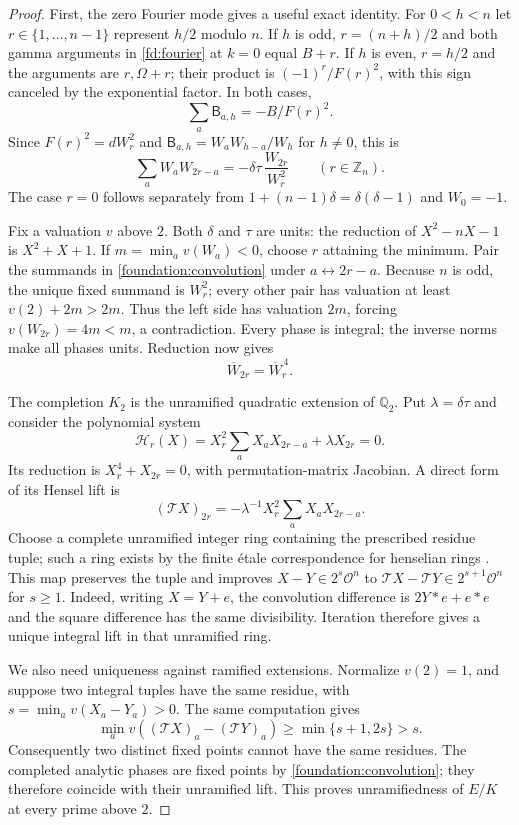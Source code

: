 \documentclass[11pt]{article}
\numberwithin{equation}{section}
\theoremstyle{definition}
\theoremstyle{remark}
\begin{document}
\begin{proof}
First, the zero Fourier mode gives a useful exact identity.
For $0<h<n$ let $r\in\{1,\ldots,n-1\}$ represent $h/2$ modulo $n$.
If $h$ is odd, $r=(n+h)/2$ and both gamma arguments in
\eqref{fd:fourier} at $k=0$ equal $B+r$.
If $h$ is even, $r=h/2$ and the arguments are $r,\Omega+r$;
their product is $(-1)^r/F(r)^2$, with this sign canceled by the
exponential factor. In both cases,
\[
 \sum_a\mathsf B_{a,h}=-B/F(r)^2.
\]
Since $F(r)^2=dW_r^2$ and
$\mathsf B_{a,h}=W_aW_{h-a}/W_h$ for $h\ne0$, this is
\begin{equation}\label{foundation:convolution}
 \sum_a W_aW_{2r-a}
 =-\delta\tau\,\frac{W_{2r}}{W_r^2}\qquad(r\in\mathbb Z_n).
\end{equation}
The case $r=0$ follows separately from
$1+(n-1)\delta=\delta(\delta-1)$ and $W_0=-1$.

Fix a valuation $v$ above $2$. Both $\delta$ and $\tau$ are units:
the reduction of $X^2-nX-1$ is $X^2+X+1$.
If $m=\min_a v(W_a)<0$, choose $r$ attaining the minimum.
Pair the summands in \eqref{foundation:convolution} under
$a\leftrightarrow2r-a$. Because $n$ is odd, the unique fixed summand
is $W_r^2$; every other pair has valuation at least $v(2)+2m>2m$.
Thus the left side has valuation $2m$, forcing
$v(W_{2r})=4m<m$, a contradiction. Every phase is integral;
the inverse norms make all phases units. Reduction now gives
\begin{equation}\label{foundation:residue-frobenius}
 \overline W_{2r}=\overline W_r^{\,4}.
\end{equation}

The completion $K_2$ is the unramified quadratic extension of
$\mathbb Q_2$. Put $\lambda=\delta\tau$ and consider the polynomial
system
\[
 \mathcal H_r(X)=X_r^2\sum_aX_aX_{2r-a}+\lambda X_{2r}=0.
\]
Its reduction is $X_r^4+X_{2r}=0$, with permutation-matrix
Jacobian. A direct form of its Hensel lift is
\[
 (\mathcal T X)_{2r}=-\lambda^{-1}X_r^2\sum_aX_aX_{2r-a}.
\]
Choose a complete unramified integer ring containing the prescribed
residue tuple; such a ring exists by the finite \'etale correspondence
for henselian rings \cite[Tag~04GK]{Stacks}.
This map preserves the tuple and improves
$X-Y\in2^s\mathcal O^n$ to
$\mathcal T X-\mathcal T Y\in2^{s+1}\mathcal O^n$ for $s\geq1$.
Indeed, writing $X=Y+e$, the convolution difference is
$2Y*e+e*e$ and the square difference has the same divisibility.
Iteration therefore gives a unique integral lift in that unramified
ring.

We also need uniqueness against ramified extensions. Normalize
$v(2)=1$, and suppose two integral tuples have the same residue,
with $s=\min_a v(X_a-Y_a)>0$. The same computation gives
\[
 \min_a v((\mathcal T X)_a-(\mathcal T Y)_a)
 \geq\min\{s+1,2s\}>s.
\]
Consequently two distinct fixed points cannot have the same residues.
The completed analytic phases are fixed points by
\eqref{foundation:convolution}; they therefore coincide with their
unramified lift. This proves unramifiedness of $E/K$ at every prime
above $2$.


\end{proof}
\end{document}
